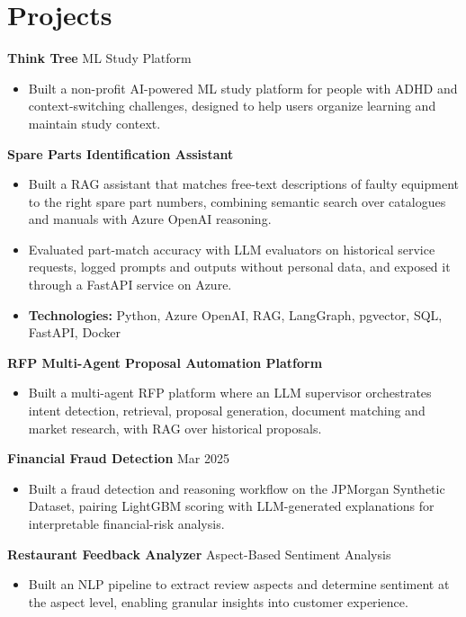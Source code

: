 \documentclass[10pt,a4paper]{article}
\begin{document}
\section{Projects}
\textbf{Think Tree} \textbar{} ML Study Platform\par
\begin{itemize}
  \item Built a non-profit AI-powered ML study platform for people with ADHD and context-switching challenges, designed to help users organize learning and maintain study context.
\end{itemize}
\textbf{Spare Parts Identification Assistant}\par
\begin{itemize}
  \item Built a RAG assistant that matches free-text descriptions of faulty equipment to the right spare part numbers, combining semantic search over catalogues and manuals with Azure OpenAI reasoning.
  \item Evaluated part-match accuracy with LLM evaluators on historical service requests, logged prompts and outputs without personal data, and exposed it through a FastAPI service on Azure.
  \item \textbf{Technologies:} Python, Azure OpenAI, RAG, LangGraph, pgvector, SQL, FastAPI, Docker
\end{itemize}
\textbf{RFP Multi-Agent Proposal Automation Platform}\par
\begin{itemize}
  \item Built a multi-agent RFP platform where an LLM supervisor orchestrates intent detection, retrieval, proposal generation, document matching and market research, with RAG over historical proposals.
\end{itemize}
\textbf{Financial Fraud Detection} \textbar{} Mar 2025\par
\begin{itemize}
  \item Built a fraud detection and reasoning workflow on the JPMorgan Synthetic Dataset, pairing LightGBM scoring with LLM-generated explanations for interpretable financial-risk analysis.
\end{itemize}
\textbf{Restaurant Feedback Analyzer} \textbar{} Aspect-Based Sentiment Analysis\par
\begin{itemize}
  \item Built an NLP pipeline to extract review aspects and determine sentiment at the aspect level, enabling granular insights into customer experience.
\end{itemize}
\end{document}
